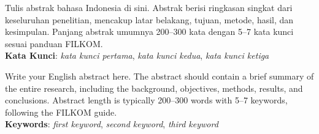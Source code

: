 \documentclass{skripsi}
\newif\ifpendahuluansaja
\begin{document}
{\abstractind

  \noindent
  Tulis abstrak bahasa Indonesia di sini. Abstrak berisi ringkasan
  singkat dari keseluruhan penelitian, mencakup latar belakang, tujuan,
  metode, hasil, dan kesimpulan. Panjang abstrak umumnya 200--300 kata dengan 5--7 kata kunci sesuai panduan FILKOM.\\

  \noindent
  \textbf{Kata Kunci}: \emph{kata kunci pertama},
  \emph{kata kunci kedua}, \emph{kata kunci ketiga}

}

{\abstracteng

  \noindent
  Write your English abstract here. The abstract should contain a brief
  summary of the entire research, including the background, objectives,
  methods, results, and conclusions. Abstract length is typically
  200--300 words with 5--7 keywords, following the FILKOM guide.\\

  \noindent
  \textbf{Keywords}: \emph{first keyword},
  \emph{second keyword}, \emph{third keyword}

}

\tableofcontents
{}
\listoftables
{}
\listoffigures
{}
\fi

\clearpage{}\setcounter{page}{1}


\ifpendahuluansaja\else


% 
% 
% 
% 
\fi

\printbibliography[heading=bibintoc,title={DAFTAR REFERENSI}]
\end{document}
